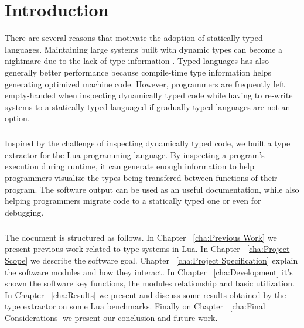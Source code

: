 
\chapter{Introduction}
There are several reasons that motivate the adoption of statically typed languages. Maintaining large systems built with dynamic types can become a nightmare due to the lack of type information \cite{takikawa_is_2016}. Typed languages has also generally better performance because compile-time type information helps generating optimized machine code. However, programmers are frequently left empty-handed when inspecting dynamically typed code while having to re-write systems to a statically typed languaged if gradually typed languages are not an option.
\paragraph*{}
Inspired by the challenge of inspecting dynamically typed code, we built a type extractor for the Lua programming language. By inspecting a program's execution during runtime, it can generate enough information to help programmers visualize the types being transfered between functions of their program. The software output can be used as an useful documentation, while also helping programmers migrate code to a statically typed one or even for debugging.
\paragraph*{}
The document is structured as follows. In Chapter ~\ref{cha:Previous Work} we present previous work related to type systems in Lua. In Chapter ~\ref{cha:Project Scope} we describe the software goal. Chapter ~\ref{cha:Project Specification} explain the software modules and how they interact. In Chapter ~\ref{cha:Development} it's shown the software key functions, the modules relationship and basic utilization. In Chapter ~\ref{cha:Results} we present and discuss some results obtained by the type extractor on some Lua benchmarks. Finally on Chapter ~\ref{cha:Final Considerations} we present our conclusion and future work.




